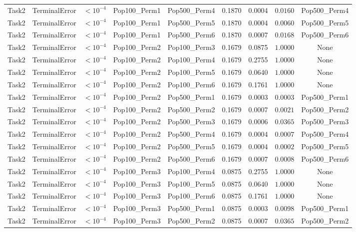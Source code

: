 \documentclass[8pt]{article}
\begin{document}
\begin{longtable}{llccccccc}
Task2 & TerminalError & $< 10^{-4}$ & Pop100\_Perm1 & Pop500\_Perm4 & 0.1870 & 0.0004 & $0.0160$ & Pop500\_Perm4 \\
Task2 & TerminalError & $< 10^{-4}$ & Pop100\_Perm1 & Pop500\_Perm5 & 0.1870 & 0.0004 & $0.0060$ & Pop500\_Perm5 \\
Task2 & TerminalError & $< 10^{-4}$ & Pop100\_Perm1 & Pop500\_Perm6 & 0.1870 & 0.0007 & $0.0168$ & Pop500\_Perm6 \\
Task2 & TerminalError & $< 10^{-4}$ & Pop100\_Perm2 & Pop100\_Perm3 & 0.1679 & 0.0875 & $1.0000$ & None \\
Task2 & TerminalError & $< 10^{-4}$ & Pop100\_Perm2 & Pop100\_Perm4 & 0.1679 & 0.2755 & $1.0000$ & None \\
Task2 & TerminalError & $< 10^{-4}$ & Pop100\_Perm2 & Pop100\_Perm5 & 0.1679 & 0.0640 & $1.0000$ & None \\
Task2 & TerminalError & $< 10^{-4}$ & Pop100\_Perm2 & Pop100\_Perm6 & 0.1679 & 0.1761 & $1.0000$ & None \\
Task2 & TerminalError & $< 10^{-4}$ & Pop100\_Perm2 & Pop500\_Perm1 & 0.1679 & 0.0003 & $0.0003$ & Pop500\_Perm1 \\
Task2 & TerminalError & $< 10^{-4}$ & Pop100\_Perm2 & Pop500\_Perm2 & 0.1679 & 0.0007 & $0.0021$ & Pop500\_Perm2 \\
Task2 & TerminalError & $< 10^{-4}$ & Pop100\_Perm2 & Pop500\_Perm3 & 0.1679 & 0.0006 & $0.0365$ & Pop500\_Perm3 \\
Task2 & TerminalError & $< 10^{-4}$ & Pop100\_Perm2 & Pop500\_Perm4 & 0.1679 & 0.0004 & $0.0007$ & Pop500\_Perm4 \\
Task2 & TerminalError & $< 10^{-4}$ & Pop100\_Perm2 & Pop500\_Perm5 & 0.1679 & 0.0004 & $0.0002$ & Pop500\_Perm5 \\
Task2 & TerminalError & $< 10^{-4}$ & Pop100\_Perm2 & Pop500\_Perm6 & 0.1679 & 0.0007 & $0.0008$ & Pop500\_Perm6 \\
Task2 & TerminalError & $< 10^{-4}$ & Pop100\_Perm3 & Pop100\_Perm4 & 0.0875 & 0.2755 & $1.0000$ & None \\
Task2 & TerminalError & $< 10^{-4}$ & Pop100\_Perm3 & Pop100\_Perm5 & 0.0875 & 0.0640 & $1.0000$ & None \\
Task2 & TerminalError & $< 10^{-4}$ & Pop100\_Perm3 & Pop100\_Perm6 & 0.0875 & 0.1761 & $1.0000$ & None \\
Task2 & TerminalError & $< 10^{-4}$ & Pop100\_Perm3 & Pop500\_Perm1 & 0.0875 & 0.0003 & $0.0098$ & Pop500\_Perm1 \\
Task2 & TerminalError & $< 10^{-4}$ & Pop100\_Perm3 & Pop500\_Perm2 & 0.0875 & 0.0007 & $0.0365$ & Pop500\_Perm2 \\

\end{longtable}
\end{document}
